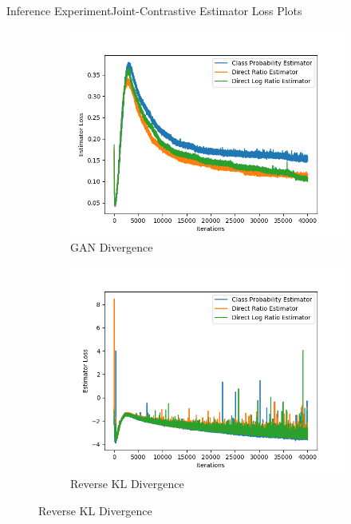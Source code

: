 \documentclass{beamer}
\begin{document}
\begin{frame}{Inference Experiment}{Joint-Contrastive Estimator Loss Plots}
\begin{figure}
\begin{subfigure}{0.49\textwidth}
\includegraphics[width=\linewidth]{estimator_losses/JCADVvsJCADVexpvsJCADVgudlog.png}
\caption{GAN Divergence}
\end{subfigure}
\begin{subfigure}{0.49\textwidth}
\includegraphics[width=\linewidth]{estimator_losses/JCKLDvsJCKLexpvsJCKLgudlog.png}
\caption{Reverse KL Divergence}
\end{subfigure}
\end{figure}
\end{frame}
\end{document}

